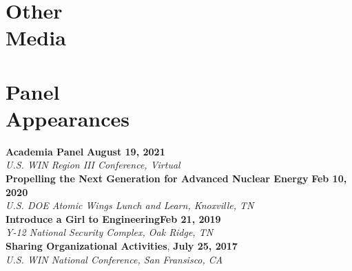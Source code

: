 \documentclass[margin,line]{resume}
\begin{document}
\begin{resume}
    \section{\mysidestyle Other\\Media}
    \begin{bibenum}
        \item {}
        \item {}
    \end{bibenum}

    \section{\mysidestyle Panel\\Appearances}
    \textbf{Academia Panel} \hfill \textbf{August 19, 2021}\\
        \textsl{U.S. WIN Region III Conference, Virtual} \\
    \textbf{Propelling the Next Generation for Advanced Nuclear Energy} \hfill \textbf{Feb 10, 2020} \\
        \textsl{U.S. DOE Atomic Wings Lunch and Learn, Knoxville, TN} \\
    \textbf{Introduce a Girl to Engineering}\hfill \textbf{Feb 21, 2019} \\
        \textsl{Y-12 National Security Complex, Oak Ridge, TN} \\
    \textbf{Sharing Organizational Activities}, \hfill \textbf{July 25, 2017} \\
        \textsl{U.S. WIN National Conference, San Fransisco, CA}

\end{resume}
\end{document}
